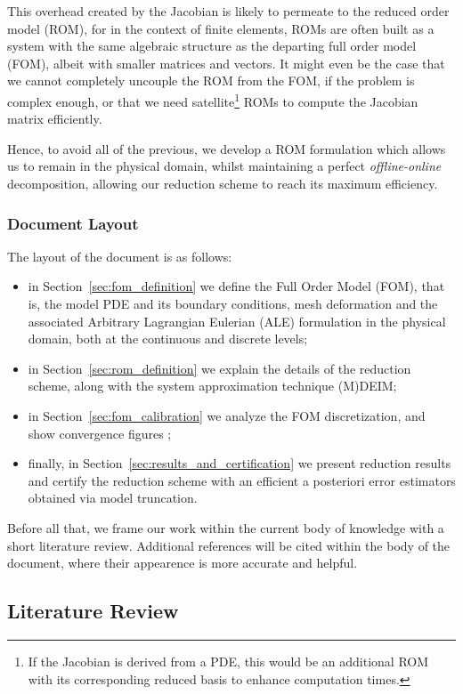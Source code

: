 \documentclass[thesis.tex]{subfiles}
\begin{document}
This overhead created by the Jacobian is likely to permeate to the reduced order model (ROM),
for in the context of finite elements, ROMs are often built as a system with the same algebraic structure
as the departing full order model (FOM),
albeit with smaller matrices and vectors. 
It might even be the case that we cannot completely uncouple the ROM from the FOM, 
if the problem is complex enough, or that we need satellite\footnote
{
    If the Jacobian is derived from a PDE, 
    this would be an additional ROM with its corresponding reduced basis to 
    enhance computation times.
} ROMs to compute the Jacobian matrix efficiently.

Hence, to avoid all of the previous, 
we develop a ROM formulation which allows us to remain in the physical domain, 
whilst maintaining a perfect \textit{offline-online} decomposition,
allowing our reduction scheme to reach its maximum efficiency.

\subsubsection{Document Layout}
The layout of the document is as follows:
\begin{itemize}
    \item in Section~\ref{sec:fom_definition} we define the Full Order Model (FOM), that is, 
    the model PDE and its boundary conditions, 
    mesh deformation and the associated Arbitrary Lagrangian Eulerian (ALE) formulation
    in the physical domain,
    both at the continuous and discrete levels;
    \item in Section~\ref{sec:rom_definition} we explain the details of the reduction scheme, 
    along with the system approximation technique (M)DEIM;
    \item in Section~\ref{sec:fom_calibration} we analyze the FOM discretization, 
    and show convergence figures 
    ;
    \item finally, in Section~\ref{sec:results_and_certification} we present reduction results
    and certify the reduction scheme with an efficient a posteriori error estimators obtained via model truncation.
\end{itemize}
Before all that, we frame our work within the current body of knowledge 
with a short literature review.
Additional references will be cited within the body of the document, 
where their appearence is more accurate and helpful.  

\subsection{Literature Review}

\end{document}

